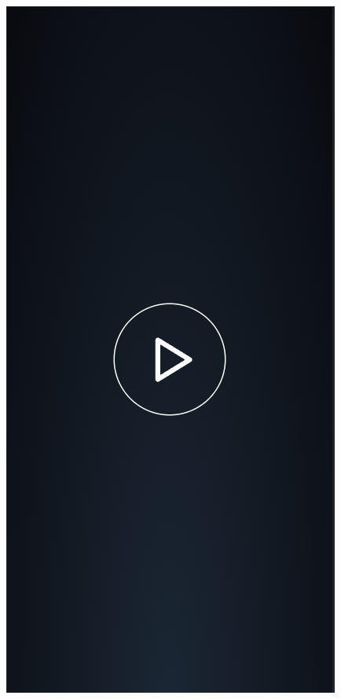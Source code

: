 \documentclass[a4paper,12pt]{scrartcl}
\begin{document}
\newpage

\begin{figure}[!h]
   \begin{minipage}[t]{.4\linewidth}
      \includegraphics[width=\linewidth]{Abbildungen/Snake_Controller.png}

\end{minipage}
\end{figure}
\end{document}
